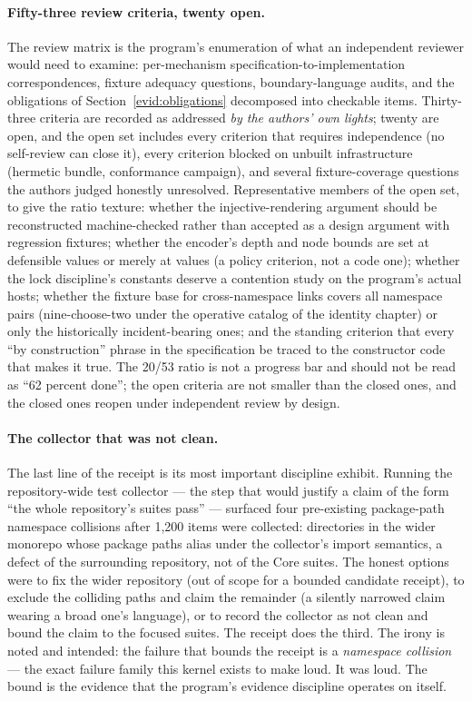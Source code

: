 \paragraph{Fifty-three review criteria, twenty open.} The review matrix is the program's enumeration of what an independent reviewer would need to examine: per-mechanism specification-to-implementation correspondences, fixture adequacy questions, boundary-language audits, and the obligations of Section~\ref{evid:obligations} decomposed into checkable items. Thirty-three criteria are recorded as addressed \emph{by the authors' own lights}; twenty are open, and the open set includes every criterion that requires independence (no self-review can close it), every criterion blocked on unbuilt infrastructure (hermetic bundle, conformance campaign), and several fixture-coverage questions the authors judged honestly unresolved. Representative members of the open set, to give the ratio texture: whether the injective-rendering argument should be reconstructed machine-checked rather than accepted as a design argument with regression fixtures; whether the encoder's depth and node bounds are set at defensible values or merely at values (a policy criterion, not a code one); whether the lock discipline's constants deserve a contention study on the program's actual hosts; whether the fixture base for cross-namespace links covers all namespace pairs (nine-choose-two under the operative catalog of the identity chapter) or only the historically incident-bearing ones; and the standing criterion that every ``by construction'' phrase in the specification be traced to the constructor code that makes it true. The 20/53 ratio is not a progress bar and should not be read as ``62 percent done''; the open criteria are not smaller than the closed ones, and the closed ones reopen under independent review by design.

\paragraph{The collector that was not clean.} The last line of the receipt is its most important discipline exhibit. Running the repository-wide test collector --- the step that would justify a claim of the form ``the whole repository's suites pass'' --- surfaced four pre-existing package-path namespace collisions after 1,200 items were collected: directories in the wider monorepo whose package paths alias under the collector's import semantics, a defect of the surrounding repository, not of the Core suites. The honest options were to fix the wider repository (out of scope for a bounded candidate receipt), to exclude the colliding paths and claim the remainder (a silently narrowed claim wearing a broad one's language), or to record the collector as not clean and bound the claim to the focused suites. The receipt does the third. The irony is noted and intended: the failure that bounds the receipt is a \emph{namespace collision} --- the exact failure family this kernel exists to make loud. It was loud. The bound is the evidence that the program's evidence discipline operates on itself.

